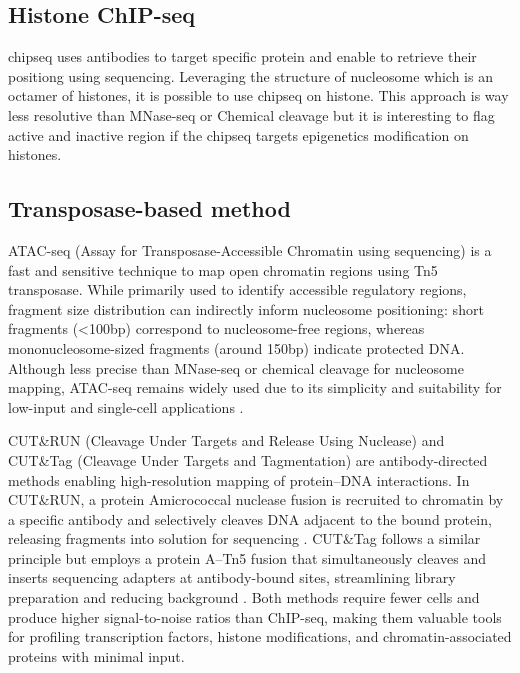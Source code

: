 \documentclass[11pt]{book}
\begin{document}
\subsection{Histone ChIP-seq}
\gls{chipseq} uses antibodies to target specific protein and enable to retrieve their positiong using sequencing. Leveraging the structure of nucleosome which is an octamer of histones, it is possible to use \gls{chipseq} on histone. This approach is way less resolutive than MNase-seq or Chemical cleavage but it is interesting to flag active and inactive region if the \gls{chipseq} targets epigenetics modification on histones.

\subsection{Transposase-based method}
ATAC-seq (Assay for Transposase-Accessible Chromatin using sequencing) is a fast and sensitive technique to map open chromatin regions using Tn5 transposase. While primarily used to identify accessible regulatory regions, fragment size distribution can indirectly inform nucleosome positioning: short fragments (<100bp) correspond to nucleosome-free regions, whereas mononucleosome-sized fragments (around 150bp) indicate protected DNA. Although less precise than MNase-seq or chemical cleavage for nucleosome mapping, ATAC-seq remains widely used due to its simplicity and suitability for low-input and single-cell applications \cite{buenrostro_transposition_2013}.

CUT\&RUN (Cleavage Under Targets and Release Using Nuclease) and CUT\&Tag (Cleavage Under Targets and Tagmentation) are antibody-directed methods enabling high-resolution mapping of protein–DNA interactions. In CUT\&RUN, a protein A\textendash\allowbreak micrococcal nuclease fusion is recruited to chromatin by a specific antibody and selectively cleaves DNA adjacent to the bound protein, releasing fragments into solution for sequencing \cite{skene_efficient_2017}.
CUT\&Tag follows a similar principle but employs a protein A–Tn5 fusion that simultaneously cleaves and inserts sequencing adapters at antibody-bound sites, streamlining library preparation and reducing background \cite{kaya-okur_cuttag_2019}. Both methods require fewer cells and produce higher signal-to-noise ratios than ChIP-seq, making them valuable tools for profiling transcription factors, histone modifications, and chromatin-associated proteins with minimal input.
\end{document}
